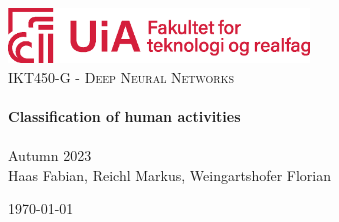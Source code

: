 \begin{titlepage}
    \vbox{ }

    \vbox{ }

    \begin{center}
        \includegraphics[width=0.6\textwidth]{img/tekreal}\\[4cm]
        \textsc{\Large IKT450-G - Deep Neural Networks}\\[0.7cm]

        \noindent\makebox[\linewidth]{\rule{.7\paperwidth}{.6pt}}\\[0.7cm]
        { \huge \bfseries Classification of human activities}\\[0.25cm]
        \noindent\makebox[\linewidth]{\rule{.7\paperwidth}{.6pt}}\\[0.7cm]
        \large{Autumn 2023}\\[1.2cm]
        \vfill
        \large
        Haas Fabian, Reichl Markus, Weingartshofer Florian

        {\large \today}
    \end{center}
\end{titlepage}